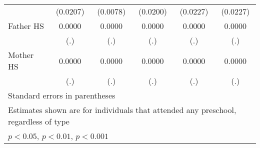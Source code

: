 \begin{table}[htbp]
\begin{tabular}{l*{5}{c}}
            &    (0.0207)         &    (0.0078)         &    (0.0200)         &    (0.0227)         &    (0.0227)         \\
\addlinespace
Father HS   &      0.0000         &      0.0000         &      0.0000         &      0.0000         &      0.0000         \\
            &         (.)         &         (.)         &         (.)         &         (.)         &         (.)         \\
\addlinespace
Mother HS   &      0.0000         &      0.0000         &      0.0000         &      0.0000         &      0.0000         \\
            &         (.)         &         (.)         &         (.)         &         (.)         &         (.)         \\
\bottomrule
\multicolumn{6}{l}{\footnotesize Standard errors in parentheses}\\
\multicolumn{6}{l}{\footnotesize Estimates shown are for individuals that attended any preschool, regardless of type}\\
\multicolumn{6}{l}{\footnotesize \sym{*} \(p<0.05\), \sym{**} \(p<0.01\), \sym{***} \(p<0.001\)}\\
\end{tabular}
\end{table}
